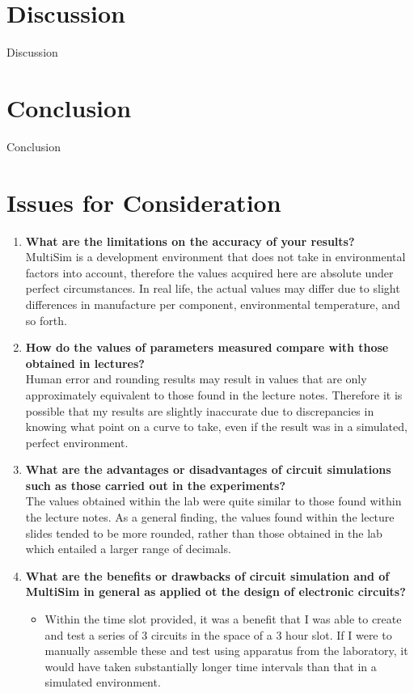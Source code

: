 \documentclass[12pt]{article}
\begin{document}
\section{Discussion}
Discussion
\section{Conclusion}
Conclusion
\section{Issues for Consideration}
\begin{enumerate}
  \item \textbf{What are the limitations on the accuracy of your results?} \hfill \\
  MultiSim is a development environment that does not take in environmental factors into account, therefore the values acquired here are absolute under perfect circumstances. In real life, the actual values may differ due to slight differences in manufacture per component, environmental temperature, and so forth.
  \item \textbf{How do the values of parameters measured compare with those obtained in lectures?} \hfill \\
  Human error and rounding results may result in values that are only approximately equivalent to those found in the lecture notes. Therefore it is possible that my results are slightly inaccurate due to discrepancies in knowing what point on a curve to take, even if the result was in a simulated, perfect environment.
  \item \textbf{What are the advantages or disadvantages of circuit simulations such as those carried out in the experiments?} \hfill \\
  The values obtained within the lab were quite similar to those found within the lecture notes. As a general finding, the values found within the lecture slides tended to be more rounded, rather than those obtained in the lab which entailed a larger range of decimals.
  \item \textbf{What are the benefits or drawbacks of circuit simulation and of MultiSim in general as applied ot the design of electronic circuits?} \hfill
  \begin{itemize}
  \item Within the time slot provided, it was a benefit that I was able to create and test a series of 3 circuits in the space of a 3 hour slot. If I were to manually assemble these and test using apparatus from the laboratory, it would have taken substantially longer time intervals than that in a simulated environment.

\end{itemize}
\end{enumerate}
\end{document}
